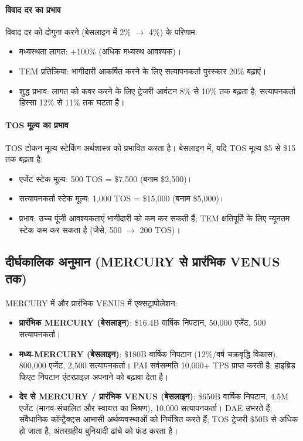 \documentclass[11pt]{article}
\begin{document}
\begin{itemize}[noitemsep]
\begin{itemize}[noitemsep]
\begin{itemize}[noitemsep]
\paragraph{विवाद दर का प्रभाव}
विवाद दर को दोगुना करने (बेसलाइन में 2\% $\to$ 4\%) के परिणाम:
\begin{itemize}[noitemsep]
  \item मध्यस्थता लागत: +100\% (अधिक मध्यस्थ आवश्यक)।
  \item TEM प्रतिक्रिया: भागीदारी आकर्षित करने के लिए सत्यापनकर्ता पुरस्कार 20\% बढ़ाएं।
  \item शुद्ध प्रभाव: लागत को कवर करने के लिए ट्रेजरी आवंटन 8\% से 10\% तक बढ़ता है; सत्यापनकर्ता हिस्सा 12\% से 11\% तक घटता है।
\end{itemize}

\paragraph{TOS मूल्य का प्रभाव}
TOS टोकन मूल्य स्टेकिंग अर्थशास्त्र को प्रभावित करता है। बेसलाइन में, यदि TOS मूल्य \$5 से \$15 तक बढ़ता है:
\begin{itemize}[noitemsep]
  \item एजेंट स्टेक मूल्य: 500 TOS = \$7{,}500 (बनाम \$2{,}500)।
  \item सत्यापनकर्ता स्टेक मूल्य: 1,000 TOS = \$15{,}000 (बनाम \$5{,}000)।
  \item प्रभाव: उच्च पूंजी आवश्यकताएं भागीदारी को कम कर सकती हैं; TEM क्षतिपूर्ति के लिए न्यूनतम स्टेक कम कर सकता है (जैसे, 500 $\to$ 200 TOS)।
\end{itemize}

\subsection{दीर्घकालिक अनुमान (MERCURY से प्रारंभिक VENUS तक)}
MERCURY में और प्रारंभिक VENUS में एक्सट्रापोलेशन:
\begin{itemize}[noitemsep]
  \item \textbf{प्रारंभिक MERCURY (बेसलाइन)}: \$16.4B वार्षिक निपटान, 50,000 एजेंट, 500 सत्यापनकर्ता।
  \item \textbf{मध्य-MERCURY (बेसलाइन)}: \$180B वार्षिक निपटान (12\%/वर्ष चक्रवृद्धि विकास), 800,000 एजेंट, 2,500 सत्यापनकर्ता। PAI सर्वसम्मति 10,000+ TPS प्राप्त करती है; हाइब्रिड फिएट निपटान एंटरप्राइज़ अपनाने को बढ़ावा देता है।
  \item \textbf{देर से MERCURY / प्रारंभिक VENUS (बेसलाइन)}: \$650B वार्षिक निपटान, 4.5M एजेंट (मानव-संचालित और स्वायत्त का मिश्रण), 10,000 सत्यापनकर्ता। DAE उभरते हैं; संवैधानिक कॉन्ट्रैक्ट्स आभासी अर्थव्यवस्थाओं को नियंत्रित करते हैं; TOS ट्रेजरी \$50B से अधिक हो जाता है, अंतरग्रहीय बुनियादी ढांचे को फंड करता है।
\end{itemize}


\end{itemize}
\end{itemize}
\end{itemize}
\end{document}
